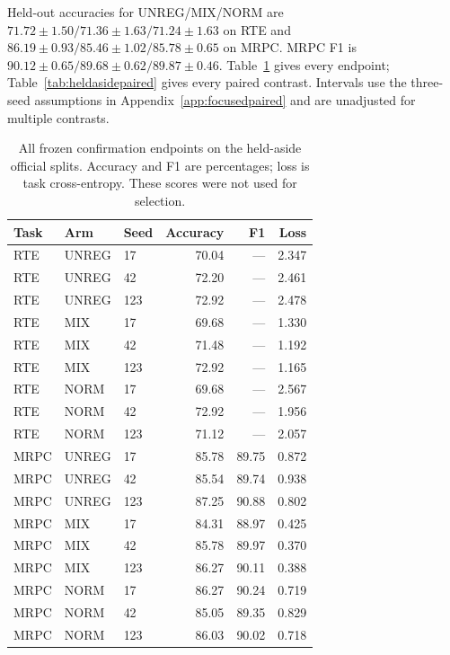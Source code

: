 \documentclass{article}
\begin{document}
Held-out accuracies for UNREG/MIX/NORM are $71.72\pm1.50/71.36\pm1.63/71.24\pm1.63$ on RTE and $86.19\pm0.93/85.46\pm1.02/85.78\pm0.65$ on MRPC. MRPC F1 is $90.12\pm0.65/89.68\pm0.62/89.87\pm0.46$. Table~\ref{tab:heldasideseeds} gives every endpoint; Table~\ref{tab:heldasidepaired} gives every paired contrast. Intervals use the three-seed assumptions in Appendix~\ref{app:focusedpaired} and are unadjusted for multiple contrasts.

\begin{table}[t]
\centering
\caption{All frozen confirmation endpoints on the held-aside official splits. Accuracy and F1 are percentages; loss is task cross-entropy. These scores were not used for selection.}
\label{tab:heldasideseeds}
\begin{tabular}{lllrrr}
\toprule
Task & Arm & Seed & Accuracy & F1 & Loss\\
\midrule
RTE & UNREG & 17 & 70.04 & --- & 2.347 \\
RTE & UNREG & 42 & 72.20 & --- & 2.461 \\
RTE & UNREG & 123 & 72.92 & --- & 2.478 \\
RTE & MIX & 17 & 69.68 & --- & 1.330 \\
RTE & MIX & 42 & 71.48 & --- & 1.192 \\
RTE & MIX & 123 & 72.92 & --- & 1.165 \\
RTE & NORM & 17 & 69.68 & --- & 2.567 \\
RTE & NORM & 42 & 72.92 & --- & 1.956 \\
RTE & NORM & 123 & 71.12 & --- & 2.057 \\
MRPC & UNREG & 17 & 85.78 & 89.75 & 0.872 \\
MRPC & UNREG & 42 & 85.54 & 89.74 & 0.938 \\
MRPC & UNREG & 123 & 87.25 & 90.88 & 0.802 \\
MRPC & MIX & 17 & 84.31 & 88.97 & 0.425 \\
MRPC & MIX & 42 & 85.78 & 89.97 & 0.370 \\
MRPC & MIX & 123 & 86.27 & 90.11 & 0.388 \\
MRPC & NORM & 17 & 86.27 & 90.24 & 0.719 \\
MRPC & NORM & 42 & 85.05 & 89.35 & 0.829 \\
MRPC & NORM & 123 & 86.03 & 90.02 & 0.718 \\
\bottomrule
\end{tabular}
\end{table}
\end{document}
